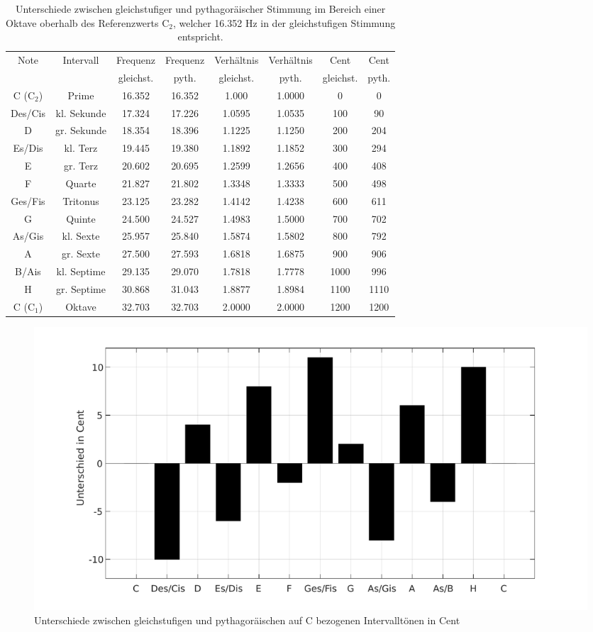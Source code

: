 \begin{enumerate}[a)]
\begin{table}
\centering
\begin{tabular}{| c | c | c | c | c | c | c | c |}
  \hline			
  Note & Intervall& Frequenz & Frequenz & Verhältnis & Verhältnis & Cent& Cent \\
  & &gleichst. & pyth. & gleichst. & pyth. & gleichst. & pyth. \\
  \hline
  C (C$_{2}$) & Prime&16.352 & 16.352 & 1.000 & 1.0000 & 0 & 0 \\
  Des/Cis & kl. Sekunde& 17.324 & 17.226 & 1.0595 & 1.0535 & 100 & 90\\
  D &gr. Sekunde &18.354 & 18.396 & 1.1225 & 1.1250 & 200 & 204\\
  Es/Dis & kl. Terz & 19.445 & 19.380 & 1.1892 & 1.1852 & 300 & 294 \\
  E & gr. Terz &20.602 & 20.695 & 1.2599 & 1.2656 & 400 & 408\\
  F & Quarte &21.827 & 21.802 & 1.3348 & 1.3333 & 500 & 498\\
  Ges/Fis & Tritonus&23.125 & 23.282 & 1.4142 & 1.4238 & 600 & 611 \\
  G & Quinte & 24.500 & 24.527 & 1.4983 & 1.5000 & 700 &  702 \\
  As/Gis & kl. Sexte& 25.957 & 25.840 & 1.5874 & 1.5802 & 800 & 792\\
  A & gr. Sexte&27.500 & 27.593 & 1.6818 & 1.6875 &  900 & 906\\
  B/Ais & kl. Septime& 29.135 & 29.070 & 1.7818 & 1.7778 & 1000 & 996 \\
  H & gr. Septime&30.868 & 31.043 & 1.8877 & 1.8984 & 1100 & 1110\\
  C (C$_{1}$)& Oktave & 32.703 & 32.703 &2.0000 &2.0000 & 1200 & 1200\\
  \hline  
\end{tabular}
\caption{Unterschiede zwischen gleichstufiger und pythagoräischer Stimmung im Bereich einer Oktave oberhalb des Referenzwerts C$_{2}$, welcher 16.352 Hz in der gleichstufigen Stimmung entspricht.}
\label{tab:t1}
\end{table}


\begin{figure}
  \centering
      \includegraphics[width=\textwidth]{Figures/diff}
 \caption{Unterschiede zwischen gleichstufigen und pythagoräischen auf C bezogenen Intervalltönen in Cent}
	\label{fig:f1}
\end{figure}







\end{enumerate}
